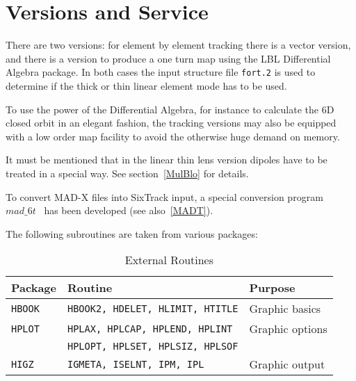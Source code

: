\section{Versions and Service}

There are two versions: for element by element tracking there is a vector version, and there is a version to produce a one turn map using the LBL Differential Algebra package.
In both cases the input structure file \texttt{fort.2} is used to determine if the thick or thin linear element mode has to be used.

To use the power of the Differential Algebra, for instance to calculate the 6D closed orbit in an elegant fashion, the tracking versions may also be equipped with a low order map facility to avoid the otherwise huge demand on memory.

It must be mentioned that in the linear thin lens version dipoles have to be treated in a special way.
See section~\ref{MulBlo} for details.

To convert MAD-X files into SixTrack input, a special conversion program $mad\_6t$~\cite{CONVERTOR} has been developed (see also~\ref{MADT}).

The following subroutines are taken from various packages:

\begin{table}[h]
    \caption{External Routines}
    \label{T-ExtRou}
    \centering
    \renewcommand{\arraystretch}{1.5}
    \begin{tabular}{|l|l|l|}
        \hline
        \rowcolor{blue!30}
        \textbf{Package} & \textbf{Routine} & \textbf{Purpose} \\
        \hline
        \texttt{HBOOK}  & \texttt{HBOOK2, HDELET, HLIMIT, HTITLE} & Graphic basics \\
        \hline
        \texttt{HPLOT}  & \texttt{HPLAX,  HPLCAP, HPLEND, HPLINT} & Graphic options \\
        \cline{2-2}
                        & \texttt{HPLOPT, HPLSET, HPLSIZ, HPLSOF} &  \\
        \hline
        \texttt{HIGZ}   & \texttt{IGMETA, ISELNT, IPM, IPL}       & Graphic output \\
        \hline
    \end{tabular}
\end{table}

